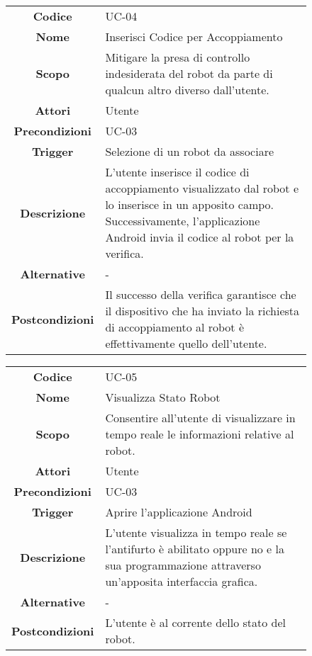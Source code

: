 \documentclass[]{article}
\begin{document}
\begin{figure}[htbp]
\centering
\begin{tabular}{|c|l|}
\hline

\textbf{Codice}
 & 
UC-04
\\

\textbf{Nome}
 & 
Inserisci Codice per Accoppiamento
\\

\textbf{Scopo}
 & 
Mitigare la presa di controllo indesiderata del robot da parte di
qualcun altro diverso dall'utente.
\\

\textbf{Attori}
 & 
Utente
\\

\textbf{Precondizioni}
 & 
UC-03
\\

\textbf{Trigger}
 & 
Selezione di un robot da associare
\\

\textbf{Descrizione}
 & 
L'utente inserisce il codice di accoppiamento visualizzato dal robot e
lo inserisce in un apposito campo. Successivamente, l'applicazione
Android invia il codice al robot per la verifica.
\\

\textbf{Alternative}
 & 
-
\\

\textbf{Postcondizioni}
 & 
Il successo della verifica garantisce che il dispositivo che ha inviato
la richiesta di accoppiamento al robot è effettivamente quello
dell'utente.
\\
\hline
\end{tabular}
\end{figure}

\begin{figure}[htbp]
\centering
\begin{tabular}{|c|l|}
\hline

\textbf{Codice}
 & 
UC-05
\\

\textbf{Nome}
 & 
Visualizza Stato Robot
\\

\textbf{Scopo}
 & 
Consentire all'utente di visualizzare in tempo reale le informazioni
relative al robot.
\\

\textbf{Attori}
 & 
Utente
\\

\textbf{Precondizioni}
 & 
UC-03
\\

\textbf{Trigger}
 & 
Aprire l'applicazione Android
\\

\textbf{Descrizione}
 & 
L'utente visualizza in tempo reale se l'antifurto è abilitato oppure no
e la sua programmazione attraverso un'apposita interfaccia
grafica.
\\

\textbf{Alternative}
 & 
-
\\

\textbf{Postcondizioni}
 & 
L'utente è al corrente dello stato del robot.
\\
\hline
\end{tabular}
\end{figure}
\end{document}
